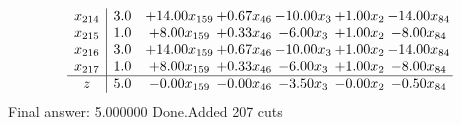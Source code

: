 \documentclass[8pt]{article}
\begin{document}
\[\begin{array}{c| c c@{\hskip 2pt} c@{\hskip 2pt} c@{\hskip 2pt} c@{\hskip 2pt} c@{\hskip 2pt} }
 x_{214}   &  3.0 & + 14.00 x_{159} & +  0.67 x_{46} & -10.00 x_{3} & +  1.00 x_{2} & -14.00 x_{84}\\
 x_{215}   &  1.0 & +  8.00 x_{159} & +  0.33 x_{46} & -6.00 x_{3} & +  1.00 x_{2} & -8.00 x_{84}\\
 x_{216}   &  3.0 & + 14.00 x_{159} & +  0.67 x_{46} & -10.00 x_{3} & +  1.00 x_{2} & -14.00 x_{84}\\
 x_{217}   &  1.0 & +  8.00 x_{159} & +  0.33 x_{46} & -6.00 x_{3} & +  1.00 x_{2} & -8.00 x_{84}\\
\hline
z    &  5.0 & -0.00 x_{159} & -0.00 x_{46} & -3.50 x_{3} & -0.00 x_{2} & -0.50 x_{84}\\
\end{array}\]
 Final answer: 5.000000 
Done.Added 207 cuts 
\end{document}
